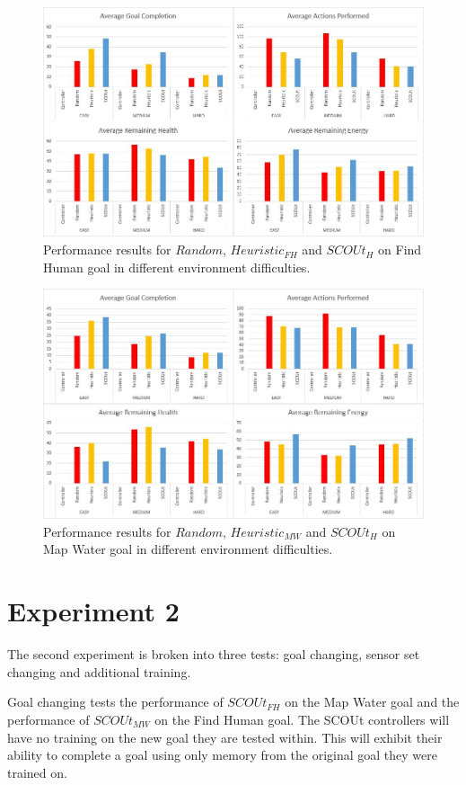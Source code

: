 \begin{figure}[h]
  \includegraphics[width=1.0\columnwidth]{Figures/Results/Experiment1/HybridFindHuman.JPG}
  \caption{Performance results for $Random$, $Heuristic_{FH}$ and $SCOUt_{H}$ on Find Human goal in different environment difficulties.}
  \label{fig:hybrid_findhuman_test_results}
\end{figure}

\begin{figure}[h]
  \includegraphics[width=1.0\columnwidth]{Figures/Results/Experiment1/HybridMapWater.JPG}
  \caption{Performance results for $Random$, $Heuristic_{MW}$ and $SCOUt_{H}$ on Map Water goal in different environment difficulties.}
  \label{fig:hybrid_mapwater_test_results}
\end{figure}





\section{Experiment 2} \label{sec:experiment2}
The second experiment is broken into three tests: goal changing, sensor set changing and additional training.

Goal changing tests the performance of $SCOUt_{FH}$ on the Map Water goal and the performance of $SCOUt_{MW}$ on the Find Human goal.
The SCOUt controllers will have no training on the new goal they are tested within.
This will exhibit their ability to complete a goal using only memory from the original goal they were trained on.
